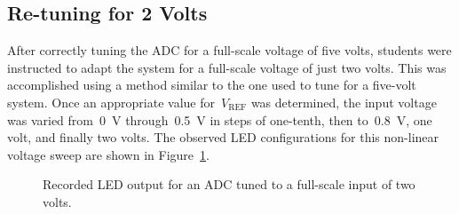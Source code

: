 \subsection{Re-tuning for 2 Volts}
After correctly tuning the ADC for a full-scale voltage of five volts, students were instructed to adapt the system for a full-scale voltage of just two volts.  This was accomplished using a method similar to the one used to tune for a five-volt system.  Once an appropriate value for~$V_\text{REF}$ was determined, the input voltage was varied from~\SI{0}{\volt} through~\SI{0.5}{\volt} in steps of one-tenth, then to~\SI{0.8}{\volt}, one volt, and finally two volts.  The observed LED configurations for this non-linear voltage sweep are shown in Figure~\ref{fig:pt6bars}.
%
\begin{figure}[H]
	\centering
	
	\parbox{.6\textwidth}{
	\caption[LED output for tuned ADC; $V_\text{FS} = \SI{2}{\volt}$]{Recorded LED output for an ADC tuned to a full-scale input of two volts.}
	\label{fig:pt6bars}}
\end{figure}
